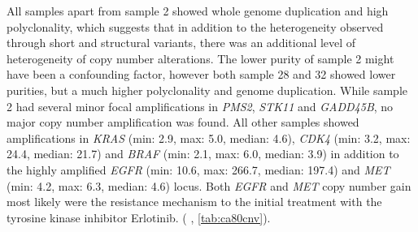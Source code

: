 All samples apart from sample 2 showed whole genome duplication and high polyclonality, which suggests that in addition to the heterogeneity observed through short and structural variants, there was an additional level of heterogeneity of copy number alterations. The lower purity of sample 2 might have been a confounding factor, however both sample 28 and 32 showed lower purities, but a much higher polyclonality and genome duplication. While sample 2 had several minor focal amplifications in \textit{PMS2}, \textit{STK11} and \textit{GADD45B}, no major copy number amplification was found. All other samples showed amplifications in \textit{KRAS} (min: 2.9, max: 5.0, median: 4.6), \textit{CDK4} (min: 3.2, max: 24.4, median: 21.7) and \textit{BRAF} (min: 2.1, max: 6.0, median: 3.9) in addition to the highly amplified \textit{EGFR} (min: 10.6, max: 266.7, median: 197.4) and \textit{MET} (min: 4.2, max: 6.3, median: 4.6) locus. Both \textit{EGFR} and \textit{MET} copy number gain most likely were the resistance mechanism to the initial treatment with the tyrosine kinase inhibitor Erlotinib. ( , \autoref{tab:ca80cnv}).


